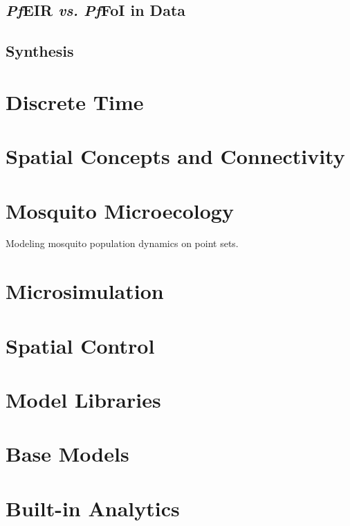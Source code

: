 \documentclass[
]{book}
\begin{document}
\section{\texorpdfstring{\emph{Pf}EIR \emph{vs.} \emph{Pf}FoI in Data}{PfEIR vs. PfFoI in Data}}\label{pfeir-vs.-pffoi-in-data}

\section{Synthesis}\label{synthesis-1}

\chapter{Discrete Time}\label{discrete-time}

\chapter{Spatial Concepts and Connectivity}\label{spatial-concepts-and-connectivity}

\chapter{Mosquito Microecology}\label{mosquito-microecology}

Modeling mosquito population dynamics on point sets.

\chapter{Microsimulation}\label{microsimulation}

\chapter{Spatial Control}\label{spatial-control}

\chapter{Model Libraries}\label{model-libraries}

\chapter{Base Models}\label{base-models}

\chapter{Built-in Analytics}\label{built-in-analytics}
\end{document}
